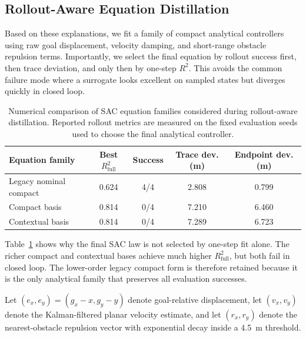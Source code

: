 \documentclass[runningheads]{llncs}
\begin{document}
\subsection{Rollout-Aware Equation Distillation}
Based on these explanations, we fit a family of compact analytical controllers using raw goal displacement, velocity damping, and short-range obstacle repulsion terms. Importantly, we select the final equation by rollout success first, then trace deviation, and only then by one-step $R^2$. This avoids the common failure mode where a surrogate looks excellent on sampled states but diverges quickly in closed loop.

\begin{table}[!tb]
\caption{Numerical comparison of SAC equation families considered during rollout-aware distillation. Reported rollout metrics are measured on the fixed evaluation seeds used to choose the final analytical controller.}
\label{tab:distill_families}
\centering
\footnotesize
\begin{tabular}{lcccc}
\toprule
Equation family & Best $R^2_{\mathrm{full}}$ & Success & Trace dev. (m) & Endpoint dev. (m) \\
\midrule
Legacy nominal compact & 0.624 & 4/4 & 2.808 & 0.799 \\
Compact basis & 0.814 & 0/4 & 7.210 & 6.460 \\
Contextual basis & 0.814 & 0/4 & 7.289 & 6.723 \\
\bottomrule
\end{tabular}
\end{table}

Table~\ref{tab:distill_families} shows why the final SAC law is not selected by one-step fit alone. The richer compact and contextual bases achieve much higher $R^2_{\mathrm{full}}$, but both fail in closed loop. The lower-order legacy compact form is therefore retained because it is the only analytical family that preserves all evaluation successes.

Let $(e_x,e_y) = (g_x-x, g_y-y)$ denote goal-relative displacement, let $(v_x,v_y)$ denote the Kalman-filtered planar velocity estimate, and let $(r_x,r_y)$ denote the nearest-obstacle repulsion vector with exponential decay inside a \SI{4.5}{m} threshold.
\end{document}
